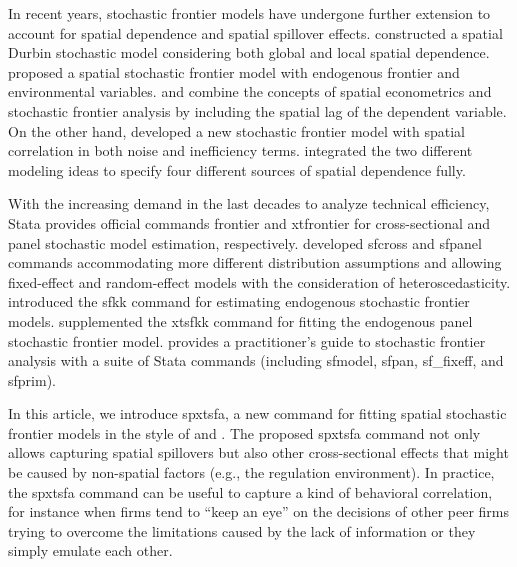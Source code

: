In recent years, stochastic frontier models have undergone further extension to account for spatial dependence and spatial spillover effects. \cite{glass2016spatial} constructed a spatial Durbin stochastic model considering both global and local spatial dependence. \cite{kutluSpatialStochasticFrontier2020} proposed a spatial stochastic frontier model with endogenous frontier and environmental variables. \cite{glass2016spatial} and \cite{kutluSpatialStochasticFrontier2020} combine the concepts of spatial econometrics and stochastic frontier analysis by including the spatial lag of the dependent variable. On the other hand, \cite{orea2019new} developed a new stochastic frontier model with spatial correlation in both noise and inefficiency terms. \cite{galli2022spatial} integrated the two different modeling ideas to specify four different sources of spatial dependence fully.  


With the increasing demand in the last decades to analyze technical efficiency, Stata provides official commands frontier and xtfrontier for cross-sectional and panel stochastic model estimation, respectively. \cite{belotti2013stochastic} developed sfcross and sfpanel commands accommodating more different distribution assumptions and allowing fixed-effect and random-effect models with the consideration of heteroscedasticity. \cite{karakaplan2017fitting} introduced the sfkk command for estimating endogenous stochastic frontier models. \cite{mustafaugurkarakaplan2018xtsfkk} supplemented the xtsfkk command for fitting the endogenous panel stochastic frontier model. \cite{kumbhakarpractitioner} provides a practitioner’s guide to stochastic frontier analysis with a suite of Stata commands (including sfmodel, sfpan, sf\_fixeff, and sfprim).

In this article, we introduce spxtsfa, a new command for fitting spatial stochastic frontier models in the style of \cite{orea2019new} and \cite{galli2022spatial}. The proposed spxtsfa command not only allows capturing spatial spillovers but also other cross-sectional effects that might be caused by non-spatial factors (e.g., the regulation environment). In practice, the spxtsfa command can be useful to capture a kind of behavioral correlation, for instance when firms tend to “keep an eye” on the decisions of other peer firms trying to overcome the limitations caused by the lack of information or they simply emulate each other.  


